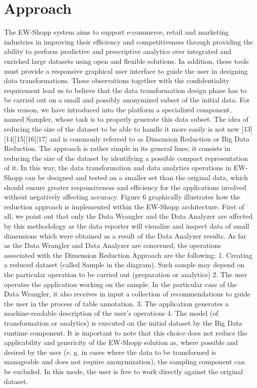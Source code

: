 \section{Approach}
The EW-Shopp system aims to support e-commerce, retail and marketing industries in improving their efficiency and competitiveness through providing the ability to perform predictive and prescriptive analytics over integrated and enriched large datasets using open and flexible solutions. In addition, these tools must provide a responsive graphical user interface to guide the user in designing data transformations. These observations together with the confidentiality requirement lead us to believe that the data transformation design phase has to be carried out on a small and possibly anonymized subset of the initial data. For this reason, we have introduced into the platform a specialized component, named Sampler, whose task is to properly generate this data subset. 
The idea of reducing the size of the dataset to be able to handle it more easily is not new [13][14][15][16][17] and is commonly referred to as Dimension Reduction or Big Data Reduction. The approach is rather simple in its general lines; it consists in reducing the size of the dataset by identifying a possible compact representation of it. In this way, the data transformation and data analytics operations in EW-Shopp can be designed and tested on a smaller set than the original data, which should ensure greater responsiveness and efficiency for the applications involved without negatively affecting accuracy.
Figure 6 graphically illustrates how the reduction approach is implemented within the EW-Shopp architecture. First of all, we point out that only the Data Wrangler and the Data Analyzer are affected by this methodology as the data reporter will visualize and inspect data of small dimensions which were obtained as a result of the Data Analyzer results. 
As far as the Data Wrangler and Data Analyzer are concerned, the operations associated with the Dimension Reduction Approach are the following:
1.	Creating a reduced dataset (called Sample in the diagram). Such sample may depend on the particular operation to be carried out (preparation or analytics)
2.	The user operates the application working on the sample. In the particular case of the Data Wrangler, it also receives in input a collection of recommendations to guide the user in the process of table annotation.
3.	The application generates a machine-readable description of the user's operations
4.	The model (of transformation or analytics) is executed on the initial dataset by the Big Data runtime component.
It is important to note that this choice does not reduce the applicability and genericity of the EW-Shopp solution as, where possible and desired by the user (e. g. in cases where the data to be transformed is manageable and does not require anonymization), the sampling component can be excluded. In this mode, the user is free to work directly against the original dataset. 

